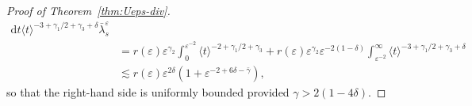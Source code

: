 \documentclass[11pt, a4paper]{scrartcl}
\numberwithin{equation}{section}
\theoremstyle{plain}
\theoremstyle{remark}
\newcommand{\mathd}{\mathrm{d}}
\begin{document}
\begin{proof}[Proof of Theorem~\ref{thm:Ueps-div}]
\[\begin{aligned}
			\mathd t \langle t \rangle^{- 3 + \gamma_1 / 2 + \gamma_3 + \delta}
			\bar{\lambda}_s^{\varepsilon}                                       \\
			 & = r (\varepsilon) \varepsilon^{\gamma_2} \int_0^{\varepsilon^{-
					2}} \langle t \rangle^{- 2 + \gamma_1 / 2 + \gamma_3} + r (\varepsilon)
			\varepsilon^{\gamma_2} \varepsilon^{- 2 (1 - \delta)}
			\int_{\varepsilon^{- 2}}^{\infty} \langle t \rangle^{- 3 + \gamma_1 / 2
			+ \gamma_3 + \delta}                                                \\
			 & \lesssim  r (\varepsilon) \varepsilon^{2 \delta} (1 +
			\varepsilon^{- 2 + 6 \delta - \bar{\gamma}}),
		\end{aligned} \]
	so that the right-hand side is uniformly bounded provided $\gamma > 2 (1 - 4 \delta)$.


\end{proof}
\end{document}
